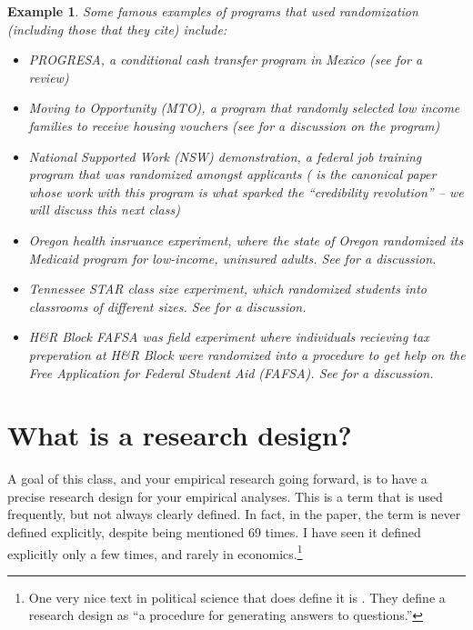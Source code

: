 \documentclass{tufte-handout}
\theoremstyle{break}
\newtheorem{exmp}{Example}
\begin{document}
\begin{boxD}
  \begin{exmp}
    Some famous examples of programs that used randomization (including those that they cite) include:
    \begin{itemize}
      \item PROGRESA, a conditional cash transfer program in Mexico (see \citet{parker2017conditional} for a review)
      \item Moving to Opportunity (MTO), a program that randomly selected low income families to receive housing vouchers (see \citet{katz2001moving} for a discussion on the program)
      \item National Supported Work (NSW) demonstration, a federal job training program that was randomized amongst applicants (\citet{lalonde1986evaluating} is the canonical paper whose work with this program is what sparked the ``credibility revolution'' -- we will discuss this next class)
      \item Oregon health insruance experiment, where the state of Oregon randomized its Medicaid program for low-income, uninsured adults. See \citet{baicker2013oregon} for a discussion.
      \item Tennessee STAR class size experiment, which randomized students into classrooms of different sizes. See \citet{krueger1999experimental} for a discussion.
      \item H\&R Block FAFSA was field experiment where individuals recieving tax preperation at H\&R Block  were randomized into a procedure to get help on the Free Application for Federal Student Aid (FAFSA).  See \citet{bettinger2012role} for a discussion.
    \end{itemize}
  \end{exmp}
\end{boxD}

\section{What is a research design?}
A goal of this class, and your empirical research going forward, is to have a precise research design for your empirical analyses. This is a term that is used frequently, but not always clearly defined. In fact, in the \citet{angrist2010credibility} paper, the term is never defined explicitly, despite being mentioned 69 times. I have seen it defined explicitly only a few times, and rarely in economics.\footnote{One very nice text in political science that does define it  is \citet{blair2023research}.  They define a research design as ``a procedure for generating answers to questions.''}
\end{document}
